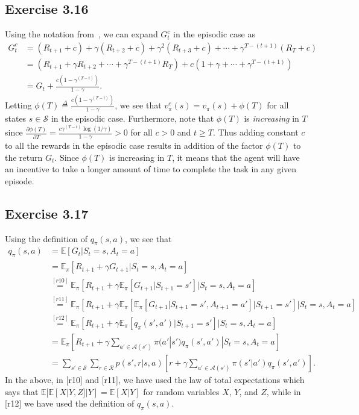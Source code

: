 \documentclass[10pt]{article}
\newcommand{\ldef}{\stackrel{\Delta}{=}}
\begin{document}
	\subsection*{Exercise 3.16}
	\label{ss:3.16}
	Using the notation from~, we can expand $G_t^c$ in the episodic case as
	\begin{align*}
	G_t^c &= (R_{t+1}+c) + \gamma(R_{t+2}+c) + \gamma^2 (R_{t+3}+c) + \cdots + \gamma^{T-(t+1)}(R_{T} + c)\\
	&= \left(R_{t+1} + \gamma R_{t+2} + \cdots + \gamma^{T-(t+1)}R_{T} \right) + c\left(1+\gamma+\cdots+\gamma^{T-(t+1)} \right)\\
	&= G_t + \frac{c(1-\gamma^{(T-t)})}{1-\gamma}.
	\end{align*}
	Letting $\phi(T) \ldef \frac{c(1-\gamma^{(T-t)})}{1-\gamma}$, we see that $v_\pi^c(s) = v_\pi(s) + \phi(T)$ for all states $s\in\mathcal{S}$ in the episodic case. Furthermore, note that $\phi(T)$ is \emph{increasing} in $T$ since $\frac{\partial \phi(T)}{\partial T} = \frac{c\gamma^{(T-t)}\log(1/\gamma)}{1-\gamma}>0$ for all $c>0$ and $t\geq T$. Thus adding constant $c$ to all the rewards in the episodic case results in addition of the factor $\phi(T)$ to the return $G_t$. Since $\phi(T)$ is increasing in $T$, it means that the agent will have an incentive to take a longer amount of time to complete the task in any given episode.
	\subsection*{Exercise 3.17}
	\label{ss:3.17}
	Using the definition of $q_{\pi}(s,a)$, we see that
	\begin{align*}
	q_{\pi}(s,a) &= \mathbb{E} \left[ G_t | S_t = s, A_t = a \right]\\
	&= \mathbb{E}_\pi \left[ R_{t+1} + \gamma G_{t+1} | S_t = s, A_t = a \right]\\
	&\stackrel{[r10]}{=} \mathbb{E}_\pi \left[ R_{t+1} + \gamma \mathbb{E}_\pi \left[ G_{t+1} | S_{t+1} = s'\right] | S_t = s, A_t = a \right]\\
	&\stackrel{[r11]}{=} \mathbb{E}_\pi \left[ R_{t+1} + \gamma \mathbb{E}_\pi \left[ \mathbb{E}_\pi \left[ G_{t+1} | S_{t+1} = s', A_{t+1} = a' \right] | S_{t+1} = s' \right] | S_t = s, A_t = a \right]\\	
	&\stackrel{[r12]}{=} \mathbb{E}_\pi \left[ R_{t+1} + \gamma \mathbb{E}_\pi \left[ q_{\pi}(s',a') | S_{t+1} = s' \right] | S_t = s, A_t = a \right]\\
	&= \mathbb{E}_\pi \left[ R_{t+1} + \gamma \sum_{a'\in\mathcal{A}(s')} \pi(a'|s')q_{\pi}(s',a') | S_t = s, A_t = a \right]\\
	&= \sum_{s'\in\mathcal{S}} \sum_{r\in\mathcal{R}} p(s',r|s,a) \left[ r + \gamma \sum_{a'\in\mathcal{A}(s')} \pi(s'|a')q_{\pi}(s',a') \right].
	\end{align*}
	In the above, in [r10] and [r11], we have used the law of total expectations which says that $\mathbb{E} [ \mathbb{E} [ X|Y,Z  ] | Y] = \mathbb{E} [ X | Y]$ for random variables $X$, $Y$, and $Z$, while in [r12] we have used the definition of $q_{\pi}(s,a)$.
\end{document}
